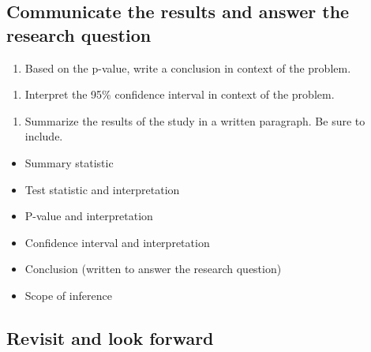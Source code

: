\documentclass[
]{report}
\providecommand{\tightlist}{%
  \setlength{\itemsep}{0pt}\setlength{\parskip}{0pt}}
\begin{document}
\hypertarget{communicate-the-results-and-answer-the-research-question}{%
\subsection{Communicate the results and answer the research question}\label{communicate-the-results-and-answer-the-research-question}}

\begin{enumerate}
\def\labelenumi{\arabic{enumi}.}
\setcounter{enumi}{16}
\tightlist
\item
  Based on the p-value, write a conclusion in context of the problem.
\end{enumerate}

\vspace{1in}

\begin{enumerate}
\def\labelenumi{\arabic{enumi}.}
\setcounter{enumi}{17}
\tightlist
\item
  Interpret the 95\% confidence interval in context of the problem.
\end{enumerate}

\vspace{1in}

\begin{enumerate}
\def\labelenumi{\arabic{enumi}.}
\setcounter{enumi}{18}
\tightlist
\item
  Summarize the results of the study in a written paragraph. Be sure to include.
\end{enumerate}

\begin{itemize}
\item
  Summary statistic
\item
  Test statistic and interpretation
\item
  P-value and interpretation
\item
  Confidence interval and interpretation
\item
  Conclusion (written to answer the research question)
\item
  Scope of inference
\end{itemize}

\vspace{2in}

\hypertarget{revisit-and-look-forward}{%
\subsection{Revisit and look forward}\label{revisit-and-look-forward}}
\end{document}
